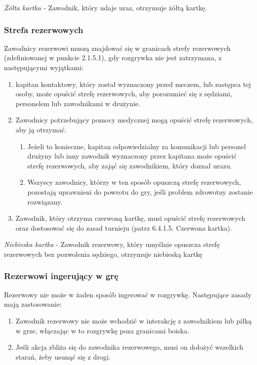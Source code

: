 \documentclass[12pt]{article}
\begin{document}
\emph{Żółta kartka -} Zawodnik, który udaje uraz, otrzymuje żółtą
kartkę.

\subsubsection{Strefa rezerwowych}

Zawodnicy rezerwowi muszą znajdować się w granicach strefy rezerwowych
(zdefiniowanej w punkcie 2.1.5.1), gdy rozgrywka nie jest zatrzymana, z
następującymi wyjątkami:

\begin{enumerate}
\item
    kapitan kontaktowy, który został wyznaczony przed meczem, lub zastępca
  tej osoby, może opuścić strefę rezerwowych, aby porozumieć się z
  sędziami, personelem lub zawodnikami w drużynie.
  \item
  Zawodnicy potrzebujący pomocy medycznej mogą opuścić strefę
  rezerwowych, aby ją otrzymać.

  \begin{enumerate}
  \item
        Jeżeli to konieczne, kapitan odpowiedzialny za komunikacji lub
    personel drużyny lub inny zawodnik wyznaczony przez kapitana może
    opuścić strefę rezerwowych, aby zająć się zawodnikiem, który doznał
    urazu.
      \item
        Wszyscy zawodnicy, którzy w ten sposób opuszczą strefę rezerwowych,
    pozostają uprawnieni do powrotu do gry, jeśli problem zdrowotny
    zostanie rozwiązany.
      \end{enumerate}
\item
  Zawodnik, który otrzyma czerwoną kartkę, musi opuścić strefę
  rezerwowych oraz dostosować się do zasad turnieju (patrz 6.4.1.5.
  Czerwona kartka).
\end{enumerate}

\emph{Niebieska kartka} - Zawodnik rezerwowy, który umyślnie opuszcza
strefę rezerwowych bez pozwolenia sędziego, otrzymuje niebieską kartkę

\subsubsection{Rezerwowi ingerujący w grę}

Rezerwowy nie może w żaden sposób ingerować w rozgrywkę. Następujące
zasady mają zastosowanie:

\begin{enumerate}
\item
  Zawodnik rezerwowy nie może wchodzić w interakcję z zawodnikiem lub
  piłką w grze, włączając w to rozgrywkę poza granicami boiska.
\item
  Jeśli akcja zbliża się do zawodnika rezerwowego, musi on dołożyć
  wszelkich starań, żeby usunąć się z drogi.
\end{enumerate}
\end{document}
